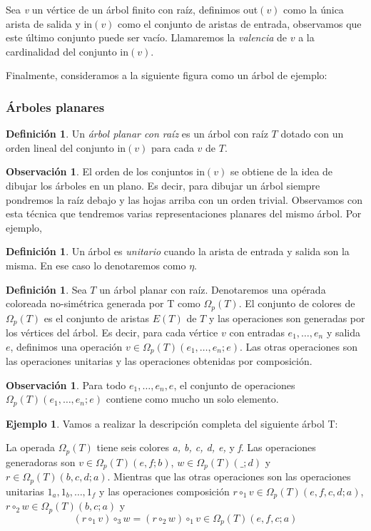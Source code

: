 \documentclass[11pt,a4paper,openright,oneside]{article}
\numberwithin{equation}{section}
\theoremstyle{definition}
\newtheorem{defi}[teo]{Definici\'on}
\newtheorem{ex}[teo]{Ejemplo}
\newtheorem{obs}[teo]{Observaci\'on}
\begin{document}
Sea \emph{v} un v\'ertice de un \'arbol finito con ra\'iz, definimos out$(v)$ como la \'unica arista de salida y in$(v)$ como el conjunto de aristas de entrada, observamos que este \'ultimo conjunto puede ser vac\'io.
Llamaremos la \emph{valencia} de $v$ a la cardinalidad del conjunto in$(v)$.

Finalmente, consideramos a la siguiente figura como un \'arbol de ejemplo:

\subsubsection{\'Arboles planares}
\begin{defi}
    Un \emph{\'arbol planar con ra\'iz} es un \'arbol con ra\'iz $T$ dotado con un orden lineal del conjunto in$(v)$ para cada $v$ de $T$.
\end{defi}
\begin{obs}
    El orden de los conjuntos in$(v)$ se obtiene de la idea de dibujar los \'arboles en un plano. Es decir, para dibujar un \'arbol siempre pondremos la ra\'iz debajo y las hojas arriba con un orden trivial.
    Observamos con esta t\'ecnica que tendremos varias representaciones planares del mismo \'arbol. Por ejemplo,
\end{obs}
\begin{defi}
    Un \'arbol es \emph{unitario} cuando la arista de entrada y salida son la misma. En ese caso lo denotaremos como $\eta$.
\end{defi}
\begin{defi}
    Sea $T$ un \'arbol planar con ra\'iz. Denotaremos una op\'erada coloreada no-sim\'etrica generada por T como $\Omega_p(T)$. El conjunto de colores de $\Omega_p(T)$ es el conjunto de aristas $E(T)$ de $T$ y las operaciones son generadas por los v\'ertices del \'arbol.
    Es decir, para cada v\'ertice $v$ con entradas $e_1,\dots,e_n$ y salida $e$, definimos una operaci\'on $v\in \Omega_p(T)(e_1,\dots,e_n;e)$. Las otras operaciones son las operaciones unitarias y las operaciones obtenidas por composici\'on.
\end{defi}
\begin{obs}
    Para todo $e_1,\dots,e_n,e$, el conjunto de operaciones $\Omega_p(T)(e_1,\dots,e_n;e)$ contiene como mucho un solo elemento.
\end{obs}
\begin{ex}
    Vamos a realizar la descripci\'on completa del siguiente \'arbol T:

    La operada $\Omega_p(T)$ tiene seis colores \textit{a, b, c, d, e,} y \textit{f}. Las operaciones generadoras son $v\in \Omega_p(T)(e,f;b)$, $w\in \Omega_p(T)(\_;d)$ y $r\in \Omega_p(T)(b,c,d;a)$.
    Mientras que las otras operaciones son las operaciones unitarias $1_a,1_b,\dots,1_f$ y las operaciones composici\'on $r\circ_1v\in \Omega_p(T)(e,f,c,d;a)$, $r\circ_2w\in \Omega_p(T)(b,c;a)$ y
    $$(r\circ_1 v)\circ_3 w = (r\circ_2 w)\circ_1 v  \in \Omega_p(T)(e,f,c;a)$$
\end{ex}
\end{document}
